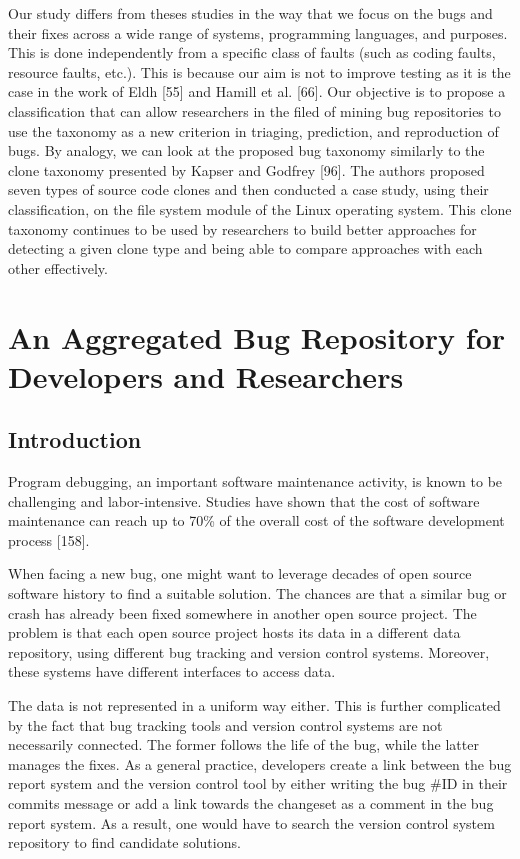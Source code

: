 \documentclass[12pt]{report}
\begin{document}
Our study differs from theses studies in the way that we focus on the
bugs and their fixes across a wide range of systems, programming
languages, and purposes. This is done independently from a specific
class of faults (such as coding faults, resource faults, etc.). This is
because our aim is not to improve testing as it is the case in the work
of Eldh {[}55{]} and Hamill et al. {[}66{]}. Our objective is to propose
a classification that can allow researchers in the filed of mining bug
repositories to use the taxonomy as a new criterion in triaging,
prediction, and reproduction of bugs. By analogy, we can look at the
proposed bug taxonomy similarly to the clone taxonomy presented by
Kapser and Godfrey {[}96{]}. The authors proposed seven types of source
code clones and then conducted a case study, using their classification,
on the file system module of the Linux operating system. This clone
taxonomy continues to be used by researchers to build better approaches
for detecting a given clone type and being able to compare approaches
with each other effectively.

\chapter{An Aggregated Bug Repository for Developers and
Researchers}\label{an-aggregated-bug-repository-for-developers-and-researchers}

\section{Introduction}\label{introduction-1}

Program debugging, an important software maintenance activity, is known
to be challenging and labor-intensive. Studies have shown that the cost
of software maintenance can reach up to 70\% of the overall cost of the
software development process {[}158{]}.

When facing a new bug, one might want to leverage decades of open source
software history to find a suitable solution. The chances are that a
similar bug or crash has already been fixed somewhere in another open
source project. The problem is that each open source project hosts its
data in a different data repository, using different bug tracking and
version control systems. Moreover, these systems have different
interfaces to access data.

The data is not represented in a uniform way either. This is further
complicated by the fact that bug tracking tools and version control
systems are not necessarily connected. The former follows the life of
the bug, while the latter manages the fixes. As a general practice,
developers create a link between the bug report system and the version
control tool by either writing the bug \#ID in their commits message or
add a link towards the changeset as a comment in the bug report system.
As a result, one would have to search the version control system
repository to find candidate solutions.
\end{document}
